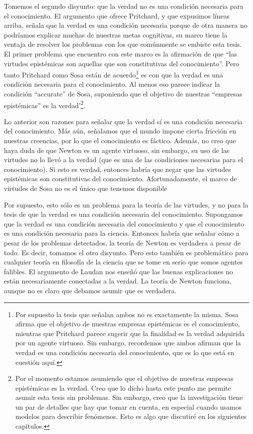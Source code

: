 \documentclass{article}
\begin{document}
Tomemos el segundo disyunto: que la verdad no es una condición necesaria para el conocimiento. El argumento que ofrece Pritchard, y que expusimos líneas arriba, señala que la verdad es una condición necesaria porque de otra manera no podríamos explicar muchas de nuestras metas cognitivas, su marco tiene la ventaja de resolver los problemas con los que comúnmente se embiste esta tesis. El primer problema que encuentro con este marco es la afirmación de que ``las virtudes epistémicas son aquellas que son constitutivas del conocimiento''. Pero tanto Pritchard como Sosa están de acuerdo\footnote{Por supuesto la tesis que señalan ambos no es exactamente la misma. Sosa afirma que el objetivo de nuestras empresas epistémicas es el conocimiento, mientras que Pritchard parece sugerir que la finalidad es la verdad adquirida por un agente virtuoso. Sin embargo, recordemos que ambos afirman que la verdad es una condición necesaria del conocimiento, que es lo que está en cuestión aquí.} es con que la verdad es una condición necesaria para el conocimiento. Al menos eso parece indicar la condición ``accurate'' de Sosa, suponiendo que el objetivo de nuestras ``empresas epistémicas'' es la verdad'\footnote{Por el momento estamos asumiendo que el objetivo de nuestras empresas epistémicas es la verdad. Creo que lo dicho hasta este punto me permite asumir esta tesis sin problemas. Sin embargo, creo que la investigación tiene un par de detalles que hay que tomar en cuenta, en especial cuando usamos modelos para describir fenómenos. Esto es algo que discutiré en los siguientes capítulos.}. 

Lo anterior son razones para señalar que la verdad sí es una condición necesaria del conocimiento. Más aún, señalamos que el mundo impone cierta fricción en nuestras creencias, por lo que el conocimiento es fáctico. Además, no creo que haya duda de que Newton es un agente virtuoso, sin embargo, su uso de las virtudes no lo llevó a la verdad (que es una de las condiciones necesarias para el conocimiento). Si esto es verdad, entonces habría que negar que las virtudes epistémicas son constitutivas del conocimiento. Afortunadamente, el marco de virtudes de Sosa no es el único que tenemos disponible

Por supuesto, esto sólo es un problema para la teoría de las virtudes, y no para la tesis de que la verdad es una condición necesaria del conocimiento. Supongamos que la verdad es una condición necesaria del conocimiento y que el conocimiento es una condición necesaria para la ciencia. Entonces habría que señalar cómo a pesar de los problemas detectados, la teoría de Newton es verdadera a pesar de todo. Es decir, tomamos el otro disyunto. Pero esto también es problemático para cualquier teoría en filosofía de la ciencia que se tome en serio que somos agentes falibles. El argumento de Laudan \citeyear{Laudan1981} nos enseñó que las buenas explicaciones no están necesariamente conectadas a la verdad. La teoría de Newton funciona, aunque no es claro que debamos asumir que es verdadera.
\end{document}
